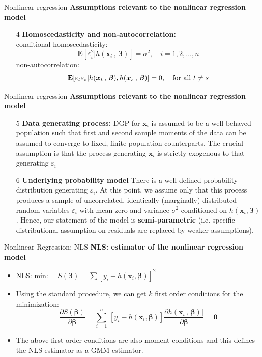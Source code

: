 \documentclass{beamer}
\begin{document}
\begin{frame}{Nonlinear regression}
\textbf{Assumptions relevant to the nonlinear regression model}\\
\medskip
\begin{itemize}
 \item[4] \textbf{Homoscedasticity and non-autocorrelation:}\\
 \medskip
 conditional homoscedasticity:
 $$
 \mathbf{E}[\varepsilon_i^2| h(\bm{x}_i\, , \,\bm{\beta})] = \sigma^2, \quad i=1,2,\dots,n
 $$
 non-autocorrelation:
 $$
 \mathbf{E}[\varepsilon_t\varepsilon_s| h(\bm{x}_t\, , \,\bm{\beta}), h(\bm{x}_s\, , \,\bm{\beta})] = 0, \quad \textnormal{for all~}t\neq s
 $$
\end{itemize}
\end{frame}
\begin{frame}{Nonlinear regression}
\textbf{Assumptions relevant to the nonlinear regression model}\\
\medskip
\begin{itemize}
\item[5] \textbf{Data generating process:} DGP for $\bm{x}_i$ is assumed to be a well-behaved population such that first and second sample moments of the data can be assumed to converge to fixed, finite population counterparts. The crucial assumption is that the process generating $\bm{x}_i$ is strictly exogenous to that generating $\varepsilon_i$
\item[6] \textbf{Underlying probability model} There is a well-defined probability distribution generating $\varepsilon_i$. At this point, we assume only that this process produces a sample of uncorrelated, identically (marginally) distributed random variables $\varepsilon_i$ with mean zero and variance $\sigma^2$ conditioned on $h(\bm{x}_i, \bm{\beta})$. Hence, our statement of the model is \textbf{semi-parametric} (i.e. specific distributional assumption on residuals are replaced by weaker assumptions).
\end{itemize}
\end{frame}
\begin{frame}{Nonlinear Regression: NLS}
\textbf{NLS: estimator of the nonlinear regression model}\\
\bigskip
\begin{itemize}
\item NLS: \qquad min:~~ $S(\bm{\beta})=\sum[y_i-h(\bm{x}_i, \bm{\beta})]^2$
\medskip
\item Using the standard procedure, we can get $k$ first order conditions for the minimization:
$$
\frac{\partial S(\bm{\beta})}{\partial \bm{\beta} } = 
\sum_{i=1}^n \, [y_i-h(\bm{x}_i, \bm{\beta})] 
\frac{\partial h(\bm{x}_i\, , \,\bm{\beta})]}{\partial \bm{\beta}}
= \bm{0}
$$

\end{itemize}
\smallskip
\begin{itemize}
\item The above first order conditions are also moment conditions and this defines the NLS estimator as a GMM estimator.
\end{itemize}
\end{frame}
\end{document}
